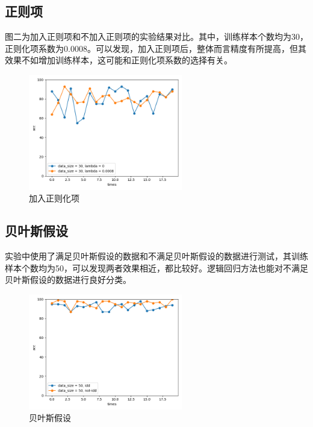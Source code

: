 \documentclass[a4paper,11pt,UTF8]{ctexart}
\newcommand{\bottomcaption}{%
\setlength{\abovecaptionskip}{6pt}%
\setlength{\belowcaptionskip}{6pt}%
\caption}
\begin{document}
\subsection{正则项}
图二为加入正则项和不加入正则项的实验结果对比。其中，训练样本个数均为30，正则化项系数为0.0008。可以发现，加入正则项后，整体而言精度有所提高，但其效果不如增加训练样本，这可能和正则化项系数的选择有关。
\begin{figure}[htbp]
  \centering
  \includegraphics[width=0.6\textwidth]{img_2.png}
  \bottomcaption{加入正则化项}
\end{figure}
\subsection{贝叶斯假设}
实验中使用了满足贝叶斯假设的数据和不满足贝叶斯假设的数据进行测试，其训练样本个数均为50，可以发现两者效果相近，都比较好。逻辑回归方法也能对不满足贝叶斯假设的数据进行良好分类。
\begin{figure}[htbp]
  \centering
  \includegraphics[width=0.6\textwidth]{img_3.png}
  \bottomcaption{贝叶斯假设}
\end{figure}
\end{document}

